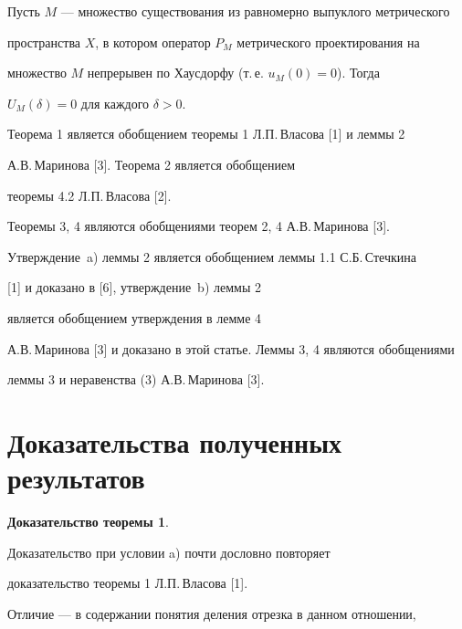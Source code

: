 \begin{cor}


Пусть $M$ --- множество существования из равномерно выпуклого метрического


пространства $X$, в котором оператор $P_{M}$ метрического проектирования на


множество $M$ непрерывен по Хаусдорфу (т.\,е. $u_{M}(0) = 0$). Тогда 


$U_{M}(\delta ) = 0$ для каждого $\delta > 0$.


\end{cor}





\begin{note}


Теорема 1 является обобщением теоремы 1 Л.П.\,Власова [1] и леммы 2 


А.В.\,Маринова [3]. Теорема 2 является обобщением


теоремы 4.2 Л.П.\,Власова [2].


Теоремы 3, 4 являются обобщениями теорем 2, 4 А.В.\,Маринова [3].


Утверждение~a) леммы 2 является обобщением леммы 1.1 С.Б.\,Стечкина 


[1] и доказано в [6], утверждение~b) леммы 2


является обобщением утверждения в лемме 4


А.В.\,Маринова [3] и доказано в этой статье. Леммы 3, 4 являются обобщениями 


леммы 3 и неравенства (3) А.В.\,Маринова [3].


\end{note}





\section{Доказательства полученных результатов}





{\bf Доказательство теоремы 1}.


Доказательство при условии a) почти дословно повторяет


доказательство теоремы 1 Л.П.\,Власова [1].


Отличие --- в содержании понятия деления отрезка в данном отношении, 


